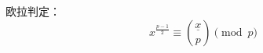 欧拉判定：
\begin{equation*}
    x^{\frac{p-1}{2}} \equiv \binom{\underline{x}}{p} \pmod p
\end{equation*}
